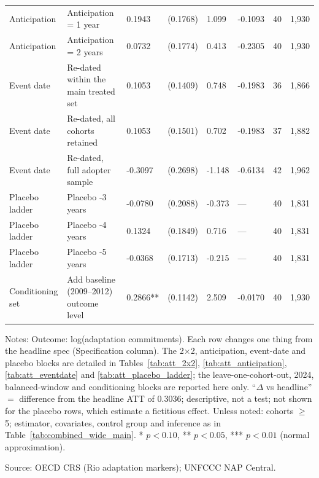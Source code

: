 \begin{table}[H]
{\begin{tabular}{llllllll}
  Anticipation & Anticipation = 1 year & 0.1943 & (0.1768) & 1.099 & -0.1093 & 40 & 1,930 \\ 
  Anticipation & Anticipation = 2 years & 0.0732 & (0.1774) & 0.413 & -0.2305 & 40 & 1,930 \\ 
  Event date & Re-dated within the main treated set & 0.1053 & (0.1409) & 0.748 & -0.1983 & 36 & 1,866 \\ 
  Event date & Re-dated, all cohorts retained & 0.1053 & (0.1501) & 0.702 & -0.1983 & 37 & 1,882 \\ 
  Event date & Re-dated, full adopter sample & -0.3097 & (0.2698) & -1.148 & -0.6134 & 42 & 1,962 \\ 
  Placebo ladder & Placebo -3 years & -0.0780 & (0.2088) & -0.373 & --- & 40 & 1,831 \\ 
  Placebo ladder & Placebo -4 years & 0.1324 & (0.1849) & 0.716 & --- & 40 & 1,831 \\ 
  Placebo ladder & Placebo -5 years & -0.0368 & (0.1713) & -0.215 & --- & 40 & 1,831 \\ 
  Conditioning set & Add baseline (2009--2012) outcome level & 0.2866** & (0.1142) & 2.509 & -0.0170 & 40 & 1,930 \\ 
   \bottomrule
\end{tabular}
}
\endgroup
\par\vspace{4pt}
\begin{minipage}{\linewidth}\footnotesize
Notes: Outcome: log(adaptation commitments). Each row changes one thing from the headline spec (Specification column). The 2$\times$2, anticipation, event-date and placebo blocks are detailed in Tables~\ref{tab:att_2x2}, \ref{tab:att_anticipation}, \ref{tab:att_eventdate} and \ref{tab:att_placebo_ladder}; the leave-one-cohort-out, 2024, balanced-window and conditioning blocks are reported here only. ``$\Delta$ vs headline'' $=$ difference from the headline ATT of 0.3036; descriptive, not a test; not shown for the placebo rows, which estimate a fictitious effect. Unless noted: cohorts $\geq$ 5; estimator, covariates, control group and inference as in Table~\ref{tab:combined_wide_main}. * $p<0.10$, ** $p<0.05$, *** $p<0.01$ (normal approximation).\par
Source: OECD CRS (Rio adaptation markers); UNFCCC NAP Central.
\end{minipage}
\end{table}
